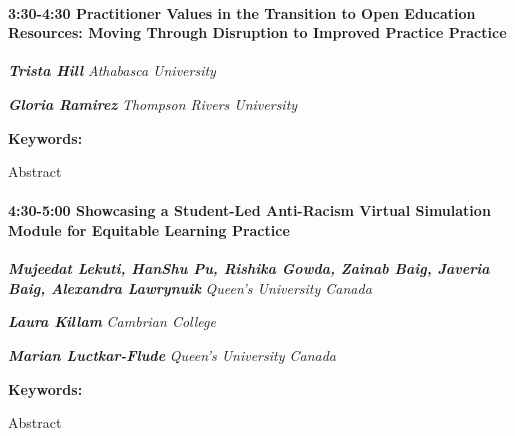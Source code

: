 \documentclass[
]{book}
\begin{document}
\begin{session}
\hypertarget{practitioner-values-in-the-transition-to-open-education-resources-moving-through-disruption-to-improved-practice-practice}{%
\paragraph*{\texorpdfstring{3:30-4:30 \textbar{} \textbf{Practitioner
Values in the Transition to Open Education Resources: Moving Through
Disruption to Improved Practice} \textbar{}
Practice}{3:30-4:30 \textbar{} Practitioner Values in the Transition to Open Education Resources: Moving Through Disruption to Improved Practice \textbar{} Practice}}\label{practitioner-values-in-the-transition-to-open-education-resources-moving-through-disruption-to-improved-practice-practice}}

\textbf{\emph{Trista Hill}} \textbar{} \emph{Athabasca University}

\textbf{\emph{Gloria Ramirez}} \textbar{} \emph{Thompson Rivers
University}

\textbf{Keywords:}

Abstract
\end{session}

\begin{session}
\hypertarget{showcasing-a-student-led-anti-racism-virtual-simulation-module-for-equitable-learning-practice}{%
\paragraph*{\texorpdfstring{4:30-5:00 \textbar{} \textbf{Showcasing a
Student-Led Anti-Racism Virtual Simulation Module for Equitable
Learning} \textbar{}
Practice}{4:30-5:00 \textbar{} Showcasing a Student-Led Anti-Racism Virtual Simulation Module for Equitable Learning \textbar{} Practice}}\label{showcasing-a-student-led-anti-racism-virtual-simulation-module-for-equitable-learning-practice}}

\textbf{\emph{Mujeedat Lekuti, HanShu Pu, Rishika Gowda, Zainab Baig,
Javeria Baig, Alexandra Lawrynuik}} \textbar{} \emph{Queen's University
Canada}

\textbf{\emph{Laura Killam}} \textbar{} \emph{Cambrian College}

\textbf{\emph{Marian Luctkar-Flude}} \textbar{} \emph{Queen's University
Canada}

\textbf{Keywords:}

Abstract
\end{session}
\end{document}
